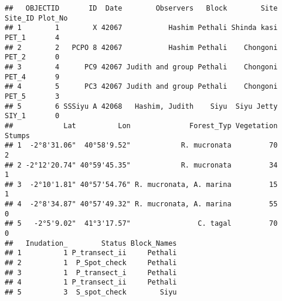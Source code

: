 \documentclass[
]{article}
\begin{document}
\begin{verbatim}
##   OBJECTID       ID  Date        Observers   Block        Site Site_ID Plot_No
## 1        1        X 42067           Hashim Pethali Shinda kasi   PET_1       4
## 2        2   PCPO 8 42067           Hashim Pethali    Chongoni   PET_2       0
## 3        4      PC9 42067 Judith and group Pethali    Chongoni   PET_4       9
## 4        5      PC3 42067 Judith and group Pethali    Chongoni   PET_5       3
## 5        6 SSSiyu A 42068   Hashim, Judith    Siyu  Siyu Jetty   SIY_1       0
##            Lat          Lon              Forest_Typ Vegetation Stumps
## 1  -2°8'31.06"  40°58'9.52"            R. mucronata         70      2
## 2 -2°12'20.74" 40°59'45.35"            R. mucronata         34      1
## 3  -2°10'1.81" 40°57'54.76" R. mucronata, A. marina         15      1
## 4  -2°8'34.87" 40°57'49.32" R. mucronata, A. marina         55      0
## 5   -2°5'9.02"  41°3'17.57"                C. tagal         70      0
##   Inudation_        Status Block_Names
## 1          1 P_transect_ii     Pethali
## 2          1  P_Spot_check     Pethali
## 3          1  P_transect_i     Pethali
## 4          1 P_transect_ii     Pethali
## 5          3  S_spot_check        Siyu
\end{verbatim}
\end{document}
